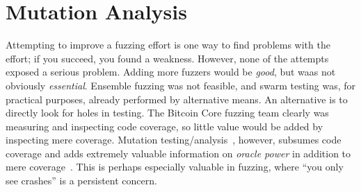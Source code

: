 \section{Mutation Analysis}

Attempting to improve a fuzzing effort is one way to find problems
with the effort; if you succeed, you found a weakness.  However, none
of the attempts exposed a serious problem.  Adding more fuzzers would
be \emph{good}, but waas not obviously \emph{essential}.  Ensemble
fuzzing was not feasible, and swarm testing was, for practical
purposes, already performed by alternative means.  An alternative is
to directly look for holes in testing.  The Bitcoin Core fuzzing team
clearly was measuring and inspecting code coverage, so little value
would be added by inspecting mere coverage.  Mutation
testing/analysis~\cite{MutationSurvey}, however, subsumes code coverage and adds extremely
valuable information on \emph{oracle power} in addition to mere
coverage~\cite{Discontents}.  This is perhaps especially valuable in fuzzing, where ``you
only see crashes'' is a persistent concern.

